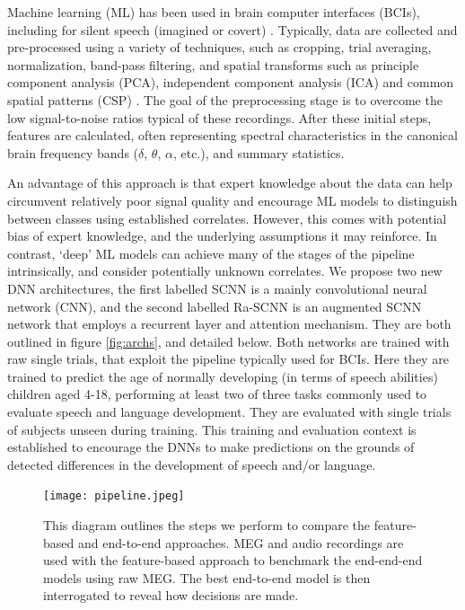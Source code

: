 \documentclass[fleqn,10pt]{wlscirep}
\begin{document}
Machine learning (ML) has been used in brain computer interfaces (BCIs), including for silent speech (imagined or covert) \cite{Sereshkeh2017, Guimaraes2007, Zhao2015a}. Typically, data are collected and pre-processed using a variety of techniques, such as cropping, trial averaging, normalization, band-pass filtering, and spatial transforms such as principle component analysis (PCA), independent component analysis (ICA) and common spatial patterns (CSP) \cite{RezaeiTabar2016,Muller-Gerking1999}. The goal of the preprocessing stage is to overcome the low signal-to-noise ratios typical of these recordings. After these initial steps, features are calculated, often representing spectral characteristics in the canonical brain frequency bands ($\delta$, $\theta$, $\alpha$, etc.), and summary statistics. %

An advantage of this approach is that expert knowledge about the data can help circumvent relatively poor signal quality and encourage ML models to distinguish between classes using established correlates. However, this comes with potential bias of expert knowledge, and the underlying assumptions it may reinforce. In contrast, `deep' ML models can achieve many of the stages of the pipeline intrinsically, and consider potentially unknown correlates. We propose two new DNN architectures, the first labelled SCNN is a mainly convolutional neural network (CNN), and the second labelled Ra-SCNN is an augmented SCNN network that employs a recurrent layer and attention mechanism. They are both outlined in figure \ref{fig:archs}, and detailed below. Both networks are trained with raw single trials, that exploit the pipeline typically used for BCIs. Here they are trained to predict the age of normally developing (in terms of speech abilities) children aged 4-18, performing at least two of three tasks commonly used to evaluate speech and language development. They are evaluated with single trials of subjects unseen during training. This training and evaluation context is established to encourage the DNNs to make predictions on the grounds of detected differences in the development of speech and/or language.

\begin{figure}[ht]
  \centering\texttt{[image: pipeline.jpeg]}
   \caption{This diagram outlines the steps we perform to compare the feature-based and end-to-end approaches. MEG and audio recordings are used with the feature-based approach to benchmark the end-end-end models using raw MEG. The best end-to-end model is then interrogated to reveal how decisions are made.}
 \label{fig:proc_stages}
\end{figure}
\end{document}
